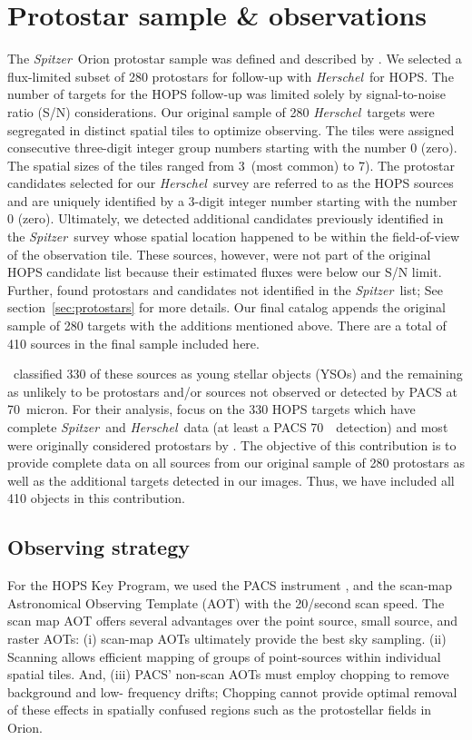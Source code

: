\documentclass[manuscript]{aastex61}
\newcommand{\herschel}{{\em Herschel}}
\newcommand{\spitzer}{{\em Spitzer}}
\begin{document}
\section{Protostar sample \& observations}
\label{sec:sample}
\par
The \spitzer\ Orion protostar sample was defined and described by \cite{orion}.  We selected a flux-limited subset of 280 protostars for follow-up with \herschel\  for HOPS.  The number of targets for the HOPS follow-up was limited solely by signal-to-noise ratio (S/N) considerations.  Our original sample of 280 \herschel\ targets were segregated in distinct spatial tiles to optimize observing.  The tiles were assigned consecutive three-digit integer group numbers starting with the number 0 (zero).  The spatial sizes of the tiles ranged from 3\arcmin\ (most common) to 7\arcmin).  The protostar candidates selected for our \herschel\ survey are referred to as the HOPS sources and are uniquely identified by a 3-digit integer number starting with the number 0 (zero).   Ultimately, we detected additional candidates previously identified in the \spitzer\ survey whose spatial location happened to be within the field-of-view of the observation tile.  These sources, however, were not part of the original HOPS candidate list because their estimated fluxes were below our S/N limit.  Further, \cite{pbrpaper} found protostars and candidates not identified in the \spitzer\ list; See section~\ref{sec:protostars} for more details.  Our final catalog appends the original sample of 280 targets with the additions mentioned above.  There are a total of 410 sources in the final sample included here.
\par
\cite{furlan}\ classified 330 of these sources as young stellar objects (YSOs) and the remaining as unlikely to be protostars and/or sources not observed or detected by PACS at 70~micron.  For their analysis, \cite{furlan} focus on the 330 HOPS targets which have complete \spitzer\ and \herschel\ data (at least a PACS 70~\micron\ detection) and most were originally considered protostars by \cite{orion}.  The objective of this contribution is to provide complete data on all sources from our original sample of 280 protostars as well as the additional targets detected in our images.  Thus, we have included all 410 objects in this contribution.

\subsection{Observing strategy}
\label{sec:obs}
\par
For the HOPS Key Program, we used the PACS instrument \citep{pacs}, and the scan-map Astronomical Observing Template (AOT) with the 20\arcsec/second scan speed.  The scan map AOT offers several advantages over the point source, small source, and raster AOTs: (i) scan-map AOTs ultimately provide the best sky sampling.  (ii) Scanning allows efficient mapping of groups of point-sources within individual spatial tiles.  And, (iii) PACS' non-scan AOTs must employ chopping to remove background and low- frequency drifts; Chopping cannot provide optimal removal of these effects in spatially confused regions such as the protostellar fields in Orion.
\end{document}
